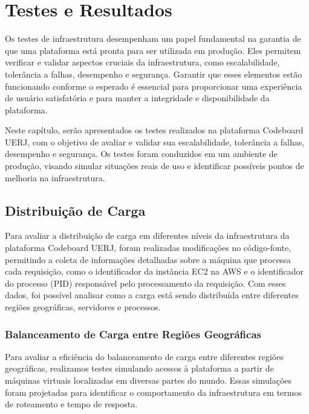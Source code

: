 \chapter{Testes e Resultados}

Os testes de infraestrutura desempenham um papel fundamental na garantia de que uma plataforma está pronta para ser utilizada em produção. Eles permitem verificar e validar aspectos cruciais da infraestrutura, como escalabilidade, tolerância a falhas, desempenho e segurança. Garantir que esses elementos estão funcionando conforme o esperado é essencial para proporcionar uma experiência de usuário satisfatória e para manter a integridade e disponibilidade da plataforma.

Neste capítulo, serão apresentados os testes realizados na plataforma Codeboard UERJ, com o objetivo de avaliar e validar sua escalabilidade, tolerância a falhas, desempenho e segurança. Os testes foram conduzidos em um ambiente de produção, visando simular situações reais de uso e identificar possíveis pontos de melhoria na infraestrutura.


\section{Distribuição de Carga}

Para avaliar a distribuição de carga em diferentes níveis da infraestrutura da plataforma Codeboard UERJ, foram realizadas modificações no código-fonte, permitindo a coleta de informações detalhadas sobre a máquina que processa cada requisição, como o identificador da instância EC2 na AWS e o identificador do processo (PID) responsável pelo processamento da requisição. Com esses dados, foi possível analisar como a carga está sendo distribuída entre diferentes regiões geográficas, servidores e processos.

\subsection{Balanceamento de Carga entre Regiões Geográficas}

Para avaliar a eficiência do balanceamento de carga entre diferentes regiões geográficas, realizamos testes simulando acessos à plataforma a partir de máquinas virtuais localizadas em diversas partes do mundo. Essas simulações foram projetadas para identificar o comportamento da infraestrutura em termos de roteamento e tempo de resposta.

